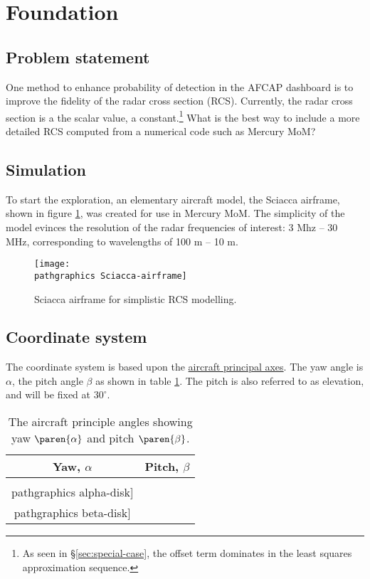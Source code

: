 % 

\section{Foundation}

\subsection{Problem statement}
One method to enhance probability of detection in the AFCAP dashboard is to improve the fidelity of the radar cross section (RCS). Currently, the  
radar cross section is a the scalar value, a constant.\footnote{As seen in \S \ref{sec:special-case}, the offset term dominates in the least squares approximation sequence.} What is the best way to include a more detailed RCS computed from a numerical code such as Mercury MoM?

\subsection{Simulation}
To start the exploration, an elementary aircraft model, the Sciacca airframe, shown in figure \ref{fig:ptw}, was created for use in Mercury MoM. The simplicity of the model evinces the resolution of the radar frequencies of interest:  3 Mhz -- 30 MHz, corresponding to wavelengths of 100 m -- 10 m. 
%
\begin{figure}[htbp]
	\begin{center}
		\texttt{[image: \\pathgraphics Sciacca-airframe]}
		\caption{Sciacca airframe for simplistic RCS modelling.}
\end{center}
\label{fig:ptw}
\end{figure}
%
\subsection{Coordinate system}
The coordinate system is based upon the \href{https://en.wikipedia.org/wiki/Aircraft_principal_axes}{aircraft principal axes}. The yaw angle is $\alpha$, the pitch angle $\beta$ as shown in table \ref{tab:yaw-pitch}. The pitch is also referred to as elevation, and will be fixed at $30^{\circ}$.
%
\begin{table}[htp]
	\begin{center}
		\begin{tabular}{cc}
			Yaw, $\alpha$ & Pitch, $\beta$  \\\hline
			\texttt{[image: \\pathgraphics alpha-disk]} &
			\texttt{[image: \\pathgraphics beta-disk]} \\
		\end{tabular}
	\end{center}
\caption{The aircraft principle angles showing yaw $\paren{\alpha}$ and pitch $\paren{\beta}$.}
\label{tab:yaw-pitch}
\end{table}%


